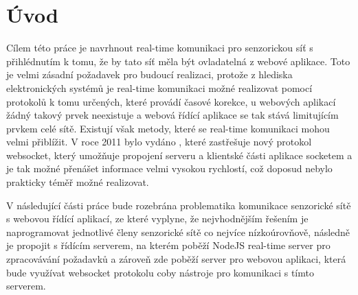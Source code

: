 \chapter{Úvod}
Cílem této práce je navrhnout real-time komunikaci pro senzorickou síť s přihlédnutím k tomu, že by tato síť měla být ovladatelná z webové aplikace. Toto je velmi zásadní požadavek pro budoucí realizaci, protože z hlediska elektronických systémů je real-time komunikaci možné realizovat pomocí protokolů k tomu určených, které provádí časové korekce, u webových aplikací žádný takový prvek neexistuje a webová řídící aplikace se tak stává limitujícím prvkem celé sítě. Existují však metody, které se real-time komunikaci mohou velmi přiblížit. V roce 2011 bylo vydáno \cite[RFC 6455]{rfc6455}, které zastřešuje nový protokol websocket, který umožňuje propojení serveru a klientské části aplikace socketem a je tak možné přenášet informace velmi vysokou rychlostí, což doposud nebylo prakticky téměř možné realizovat.

V následující části práce bude rozebrána problematika komunikace senzorické sítě s webovou řídící aplikací, ze které vyplyne, že nejvhodnějším řešením je naprogramovat jednotlivé členy senzorické sítě co nejvíce nízkoúrovňově, následně je propojit s řídícím serverem, na kterém poběží NodeJS real-time server pro zpracovávání požadavků a zároveň zde poběží server pro webovou aplikaci, která bude využívat websocket protokolu coby nástroje pro komunikaci s tímto serverem.